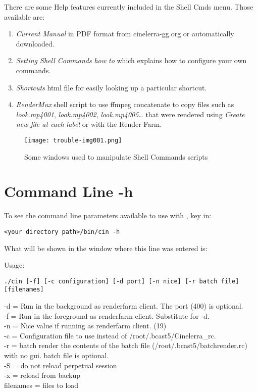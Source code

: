 There are some Help features currently included in the Shell Cmds menu. Those available are:

\begin{enumerate}
	\item \textit{Current Manual} in PDF format from cinelerra-gg.org or automatically downloaded.
	\item \textit{Setting Shell Commands} \textit{how to} which explains how to configure your own commands.
	\item \textit{Shortcuts} html file for easily looking up a particular shortcut.
	\item \textit{RenderMux} shell script to use ffmpeg concatenate to copy files such as \textit{look.mp4001}, \textit{look.mp4002}, \textit{look.mp4005}{\dots} that were rendered using \textit{Create new file at each label} or with the Render Farm.
\end{enumerate}

\begin{figure}[h!]
	\centering
	\texttt{[image: trouble-img001.png]} 
	\caption{Some windows used to manipulate Shell Commands scripts}
	\label{fig:shell_script_manupulation}
\end{figure}

\section{\CGG{} Command Line -h}%
\label{cha:cinelerra_command_line_-h}

To see the command line parameters available to use with \CGG{}, key in:

\qquad \texttt{<your \CGG{} directory path>/bin/cin -h}

What will be shown in the window where this line was entered is:

Usage:

\texttt{./cin [-f] [-c configuration] [-d port] [-n nice] [-r batch file] [filenames]}

-d = Run in the background as renderfarm client.  The port (400) is optional.\\
-f = Run in the foreground as renderfarm client. Substitute for -d.\\
-n = Nice value if running as renderfarm client. (19)\\
-c = Configuration file to use instead of /root/.bcast5/Cinelerra\_rc.\\
-r = batch render the contents of the batch file (/root/.bcast5/batchrender.rc) with no gui. batch file is optional.\\
-S = do not reload perpetual session\\
-x = reload from backup\\
filenames = files to load

